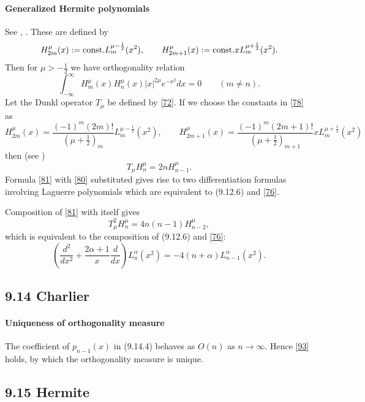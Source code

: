 \documentclass[twoside,11pt]{article}
\newcommand\al\alpha
\newcommand\half{\frac12}
\newcommand\thalf{\tfrac12}
\newcommand\iy\infty
\newcommand\const{{\rm const.} }
\begin{document}
\paragraph{Generalized Hermite polynomials}
See , \cite[Section 1.5.1]{K26}.
These are defined by
\begin{equation}
H_{2m}^\mu(x):=\const L_m^{\mu-\half}(x^2),\qquad
H_{2m+1}^\mu(x):=\const x L_m^{\mu+\half}(x^2).
\label{78}
\end{equation}
Then for $\mu>-\thalf$ we have orthogonality relation
\begin{equation}
\int_{-\iy}^{\iy} H_m^\mu(x) H_n^\mu(x) |x|^{2\mu}e^{-x^2} dx
=0\qquad(m\ne n).
\label{79}
\end{equation}
Let the Dunkl operator $T_\mu$ be defined by \eqref{72}.
If we choose the constants in \eqref{78} as
\begin{equation}
H_{2m}^\mu(x)=\frac{(-1)^m(2m)!}{(\mu+\thalf)_m} L_m^{\mu-\half}(x^2),\qquad
H_{2m+1}^\mu(x)=\frac{(-1)^m(2m+1)!}{(\mu+\thalf)_{m+1}} 
 x L_m^{\mu+\half}(x^2)
 \label{80}
\end{equation}
then (see \cite[(1.6)]{K5})
\begin{equation}
T_\mu H_n^\mu=2n H_{n-1}^\mu.
\label{81}
\end{equation}
Formula \eqref{81} with \eqref{80} substituted gives rise to two
differentiation formulas involving Laguerre polynomials which are equivalent to
(9.12.6) and \eqref{76}.

Composition of \eqref{81} with itself gives
\[
T_\mu^2 H_n^\mu=4n(n-1) H_{n-2}^\mu,
\]
which is equivalent to the composition of (9.12.6) and \eqref{76}:
\begin{equation}
\left(\frac{d^2}{dx^2}+\frac{2\al+1}x \frac d{dx}\right)L_n^\al(x^2)
=-4(n+\al) L_{n-1}^\al(x^2).
\label{82}
\end{equation}
%
\subsection*{9.14 Charlier}
\label{sec9.14}
%
\paragraph{Uniqueness of orthogonality measure}
The coefficient of $p_{n-1}(x)$ in (9.14.4) behaves as $O(n)$ as $n\to\iy$.
Hence \eqref{93} holds, by which the orthogonality measure is unique.
%
\subsection*{9.15 Hermite}
\label{sec9.15}
%
\end{document}
